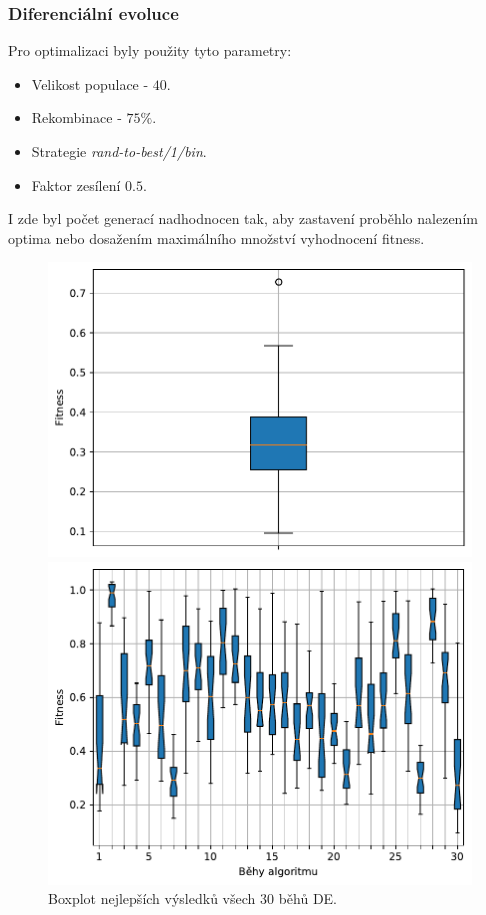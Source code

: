 \subsubsection{Diferenciální evoluce}
Pro optimalizaci byly použity tyto parametry:
\begin{itemize}
    \item Velikost populace - $40$.
    \item Rekombinace - $75\%$.
    \item Strategie \emph{rand-to-best/1/bin}.
    \item Faktor zesílení $0.5$.
\end{itemize}
I zde byl počet generací nadhodnocen tak, aby zastavení proběhlo nalezením optima nebo dosažením maximálního množství vyhodnocení fitness.

\begin{figure}[H]
\begin{minipage}[t]{0.475\linewidth}
\includegraphics[width=\linewidth]{obrazky-figures/statistics/Benchmarks/Griewank/DE/bestsBoxplot_WithOutliers.pdf}
\caption{Boxplot nejlepších výsledků všech $30$ běhů DE.}
\label{fg:bench:griewank:de:best}
\end{minipage}
\hfill
\begin{minipage}[t]{0.475\linewidth}
\includegraphics[width=\linewidth]{obrazky-figures/statistics/Benchmarks/Griewank/DE/lastGenBoxplots.pdf}

\end{minipage}
\end{figure}
